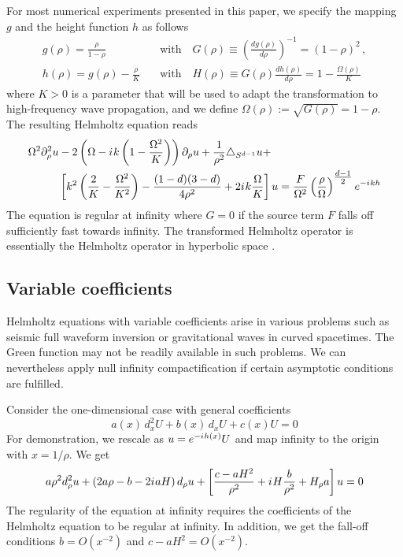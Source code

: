 \documentclass[final,onefignum,onetabnum]{siamart190516}
\newcommand{\iu}{{i\mkern1mu}}
\begin{document}
For most numerical experiments presented in this paper, we specify the mapping $g$ and the height function $h$ as follows
\begin{align} 
\label{eq:g}
g(\rho) = \frac{\rho}{1-\rho} \quad &\mathrm{with}\quad G(\rho) \equiv \left(\frac{d g(\rho)}{d\rho}\right)^{-1} = (1-\rho)^2\,, \\
\label{eq:h}
h(\rho) = g(\rho) - \frac{\rho}{K} \quad &\mathrm{with}\quad H(\rho) \equiv G(\rho) \frac{d h(\rho)}{d\rho} = 1 - \frac{\Omega(\rho)}{K} 
\end{align}
where $K>0$ is a parameter that will be used to adapt the transformation to high-frequency wave propagation, and we define $\Omega(\rho):=\sqrt{G(\rho)} = 1-\rho$. 
The resulting Helmholtz equation reads
\begin{align}\label{eq:hyp_specific}
	\Omega^2 \partial_\rho^2 u & - 2\left(\Omega - \iu k \left(1-\frac{\Omega^2}{K}\right)\right) \partial_\rho u + \frac{1}{\rho^2}\triangle_{S^{d-1}} u + \nonumber \\
	             & \left[k^2 \left( \frac{2}{K} - \frac{\Omega^2}{K^2} \right) - \frac{(1-d)(3-d)}{4 \rho^2} + 2 \iu k \frac{\Omega}{K} \right] u = \frac{F}{\Omega^2} \left(\frac{\rho}{\Omega}\right)^{\tfrac{d-1}{2}} e^{-\iu k h}
\end{align}
The equation is regular at infinity where $G=0$ if the source term $F$ falls off sufficiently fast towards infinity. The transformed Helmholtz operator is essentially the Helmholtz operator in hyperbolic space \cite{stoll2016harmonic}. 

\subsection{Variable coefficients}

Helmholtz equations with variable coefficients arise in various problems such as seismic full waveform inversion or gravitational waves in curved spacetimes. The Green function may not be readily available in such problems. We can nevertheless apply null infinity compactification if certain asymptotic conditions are fulfilled.  

Consider the one-dimensional case with general coefficients
\[ a(x) \, d_x^2 U + b(x) \, d_x U + c(x) U = 0 \]
For demonstration, we rescale as $u=e^{-\iu h(x)} U$ and map infinity to the origin with $x=1/\rho$. We get 
\[ a \rho^2 d_\rho^2 u + \left( 2 a \rho - b - 2 \iu a H \right) d_\rho u + \left[ \frac{c-a H^2}{\rho^2} + \iu H \frac{b}{\rho^2} + H_\rho a \right] u = 0 \]
The regularity of the equation at infinity requires the coefficients of the Helmholtz equation to be regular at infinity. In addition, we get the fall-off conditions $b=O(x^{-2})$ and $c-a H^2=O(x^{-2})$.
\end{document}
